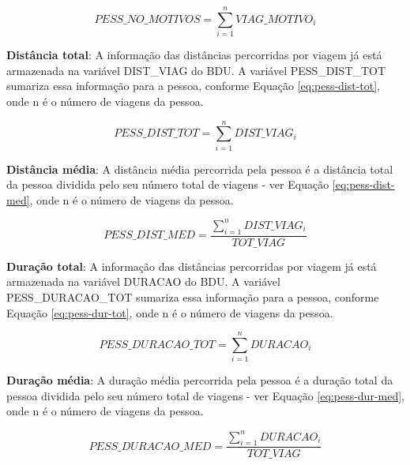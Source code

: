 \begin{compactitem}
\begin{equation}\label{eq:pess-motivo}
PESS\_NO\_MOTIVOS=\displaystyle\sum_{i=1}^{n}VIAG\_MOTIVO_{i}
\end{equation}

\item \textbf{Distância total}: A informação das distâncias percorridas por viagem já está armazenada na variável DIST_VIAG do BDU. A variável PESS_DIST_TOT sumariza essa informação para a pessoa, conforme Equação \eqref{eq:pess-dist-tot}, onde n é o número de viagens da pessoa.

\begin{equation}\label{eq:pess-dist-tot}
PESS\_DIST\_TOT=\displaystyle\sum_{i=1}^{n}DIST\_VIAG_{i}
\end{equation}

\item \textbf{Distância média}: A distância média percorrida pela pessoa é a distância total da pessoa dividida pelo seu número total de viagens - ver Equação \eqref{eq:pess-dist-med}, onde n é o número de viagens da pessoa.

\begin{equation}\label{eq:pess-dist-med}
PESS\_DIST\_MED=\frac{\displaystyle\sum_{i=1}^{n}DIST\_VIAG_{i}}{TOT\_VIAG}
\end{equation}

\item \textbf{Duração total}: A informação das distâncias percorridas por viagem já está armazenada na variável DURACAO do BDU. A variável PESS_DURACAO_TOT sumariza essa informação para a pessoa, conforme Equação \eqref{eq:pess-dur-tot}, onde n é o número de viagens da pessoa.

\begin{equation}\label{eq:pess-dur-tot}
PESS\_DURACAO\_TOT=\displaystyle\sum_{i=1}^{n}DURACAO_{i}
\end{equation}

\item \textbf{Duração média}: A duração média percorrida pela pessoa é a duração total da pessoa dividida pelo seu número total de viagens - ver Equação \eqref{eq:pess-dur-med}, onde n é o número de viagens da pessoa.

\begin{equation}\label{eq:pess-dur-med}
PESS\_DURACAO\_MED=\frac{\displaystyle\sum_{i=1}^{n}DURACAO_{i}}{TOT\_VIAG}
\end{equation}\\

\end{compactitem}

